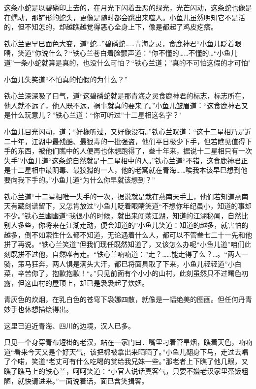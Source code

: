 \documentclass[12pt,oneside]{book}
\begin{document}
这条小蛇是以碧磷印上去的，在月光下闪着丑恶的绿光，光芒闪动，这条蛇也像是在蠕动，那铲形的蛇头，更像是随时都会跳出来噬人。小鱼儿虽然明知它不是活的，但不知怎的，却越瞧越觉得恶心全身上下，像是都起了鸡皮疙瘩。

铁心兰更早巳面色大变，道``蛇\ldots{}''碧磷蛇\ldots\ldots 青海之灵，食鹿神君``小鱼儿眨着眼睛，笑道''你说什么？``铁心兰苍白着脸颤声道：''你不懂的\ldots\ldots 不懂的\ldots{}``小鱼儿道''一条小蛇就算是真的，也没什么可怕？``铁心兰道；''真的不可怕这假的才可怕"

小鱼儿失笑道``不怕真的怕假的为什么？''

铁心兰深深吸了曰气，道``这碧磷蛇就是那青海之灵食鹿神君的标志，标志所在，他人就不远了，他人既不远，祸事就真的要来了。''小鱼儿皱眉道：``这食鹿神君又是什么玩意儿？''铁心兰道：``你可听过''十二星相这名字？"

小鱼儿目光闪动，道；``好橡听过，又好像没有。''铁心兰叹道：``这十二星相乃是近二十年，江湖中最残酷、最狠毒的一批强盗，他们平日极少下手，但若瞧见值得下手的东西，被他们瞧中的人便再也休想跑得了，叁十年来，据说十二星相只有一次失手''小鱼儿道``这条蛇自然就是十二星相中的人。''铁心兰道``不错，这食鹿神君正是十二星相中最阴毒、最狡猾的一人，他的老窝就在青海\ldots\ldots 唉我本该早巳想到他要向我下手的。''小鱼儿道``为什么你早就该想到？''

铁心兰道``十二星相唯一失手的一次，据说就是栽在燕南天手上，他们若知道燕南天有藏剑谱留下，又怎肯放过''小鱼儿眨着眼睛笑道``不想你年纪虽小，知道的事却不少。''铁心兰幽幽道``我很小的时候，就出来闯荡江湖，知道的江湖秘闻，自然比别人多些，你将来在江湖走动，便会知道的''小鱼儿笑道：知道的越多，就害怕的越多，倒不如索性什么都不知道，无论遇着什么人，都可以不管叁七二十一先和他拼了再说。``铁心兰笑道''但我们现任既然知道了，又该怎么办呢``小鱼儿道''咱们此刻既拼不过他，自然唯有走。``铁心兰喃喃道：''走？\ldots\ldots 能走得了么？\ldots。``两人一骑，策马狂奔，两人惧是满头大汗，都已将面具取了下来，小鱼儿轻轻道''小白菜，辛苦你了，抱歉抱歉！``。''只见前面有个小小的山村，此刻虽然只不过曙色初露，但这山村的屋顶上，却已是袅袅起了炊姻。

青灰色的炊烟，在乳白色的苍穹下袅娜四散，就像是一幅绝美的图画。但任何丹青妙手也休想描绘得出。

这里已迫近青海、四川的边境，汉人已多。

只见一个身穿青布短褂的老汉，站在一家门曰．嘴里刁着管旱烟，瞧着天色，喃喃道``看来今天又是个好天气，该把棉被拿出来晒晒了。''小鱼儿翻身下马，走过去唱了个喏，笑道``老丈可有什么吃喝的赏给我兄妹一些。''那老者上下瞧了他几眼，又瞧了瞧马上的铁心兰，呵呵笑道：``小官人说话真客气，只要不嫌老汉家里茶饭粗陋，就快请进来。''一面说着话，面已含笑揖客。
\end{document}
